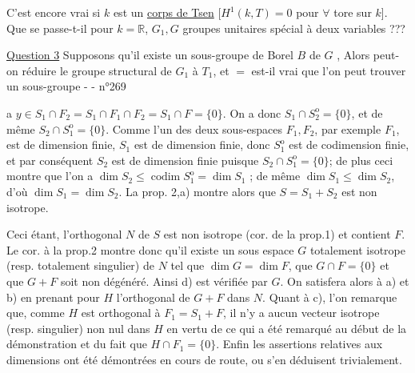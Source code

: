 
 C'est encore vrai si $k$ est un \uline{corps de Tsen}
[$H^1(k,T)=0$ pour \uline{$\forall$} tore sur $k$]. Que se passe-t-il pour $k=\mathbb R$,  $G_1,G$ groupes  unitaires spécial à deux variables ???


\deleted{\unsure{\S}}
\uline{Question 3} Supposons qu'il existe un sous-groupe de Borel $B$ de $G$ , Alors peut-on réduire le groupe structural  de $G_1$ à $T_1$, et $=$ est-il vrai que  l'on peut trouver un sous-groupe
-  -
\hfill n°269

a $y\in S_1\cap F_2=S_1\cap F_1\cap F_2=S_1\cap F=\{0\}$. On a donc $S_1\cap S_2^{\mathrm o}=\{0\}$, et de même $S_2\cap S_1^{\mathrm o}=\{0\}$. Comme l'un des deux sous-espaces $F_1,F_2$, par exemple $F_1$, est de dimension finie, $S_1$ est de dimension finie, donc $S_1^{\mathrm o}$ est de codimension finie, et par conséquent $S_2$ est de dimension finie puisque $S_2\cap S_1^{\mathrm o}=\{0\}$; de plus ceci montre que l'on a $\dim S_2\leq\operatorname{codim}S_1^{\mathrm o}=\dim S_1$ ; de même $\dim S_1\leq\dim S_2$, d'où $\dim S_1=\dim S_2$. La prop. 2,a) montre alors que $S=S_1+S_2$ est non isotrope.

Ceci étant, l'orthogonal $N$ de $S$ est non isotrope (cor. de la prop.1) et contient $F$. Le cor. à la prop.2 montre donc qu'il existe un sous espace $G$ totalement isotrope (resp. totalement singulier) de $N$ tel que $\dim G=\dim F$, que $G\cap F=\{0\}$ et que $G+F$ soit non dégénéré. Ainsi d) est vérifiée par $G$. On satisfera alors à a) et b) en prenant pour $H$ l'orthogonal de $G+F$ dans $N$. Quant à c), l'on remarque que, comme $H$ est orthogonal à $F_1=S_1+F$, il n'y a aucun vecteur isotrope (resp. singulier) non nul dans $H$ en vertu de ce qui a été remarqué au début de la démonstration et du fait que $H\cap F_1=\{0\}$. Enfin les assertions relatives aux dimensions ont été démontrées en cours de route, ou s'en déduisent trivialement.


